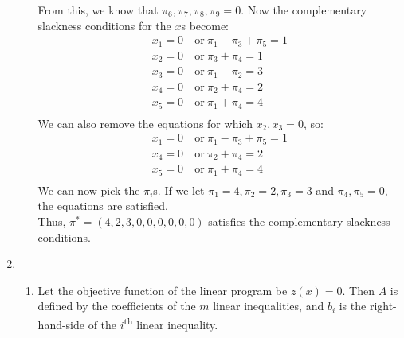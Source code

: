 \documentclass[12pt]{article}
\begin{document}
\begin{enumerate}
\begin{enumerate}
\begin{equation}
        \end{equation}
        From this, we know that $\pi_6,\pi_7,\pi_8,\pi_9=0$. Now the
        complementary slackness conditions for the $x$s become:
        \begin{equation}
          \begin{split}
            x_1=0&\ \text{or}\ \pi_1-\pi_3+\pi_5=1\\
            x_2=0&\ \text{or}\ \pi_3+\pi_4=1\\
            x_3=0&\ \text{or}\ \pi_1-\pi_2=3\\
            x_4=0&\ \text{or}\ \pi_2+\pi_4=2\\
            x_5=0&\ \text{or}\ \pi_1+\pi_4=4\\
          \end{split}
        \end{equation}
        We can also remove the equations for which $x_2,x_3=0$, so:
        \begin{equation}
          \begin{split}
            x_1=0&\ \text{or}\ \pi_1-\pi_3+\pi_5=1\\
            x_4=0&\ \text{or}\ \pi_2+\pi_4=2\\
            x_5=0&\ \text{or}\ \pi_1+\pi_4=4\\
          \end{split}
        \end{equation}
        We can now pick the $\pi_i$s. If we let $\pi_1=4,\pi_2=2,\pi_3=3$ and
        $\pi_4,\pi_5=0$, the equations are satisfied.\\

        Thus, $\pi^*=(4,2,3,0,0,0,0,0,0)$ satisfies the complementary
        slackness conditions.\\
    \end{enumerate}
  \item
    \begin{enumerate}
      \item
        Let the objective function of the linear program be $z(x)=0$. Then
        $A$ is defined by the coefficients of the $m$ linear inequalities, and
        $b_i$ is the right-hand-side of the $i$\textsuperscript{th} linear
        inequality.\\


\end{enumerate}
\end{enumerate}
\end{document}

